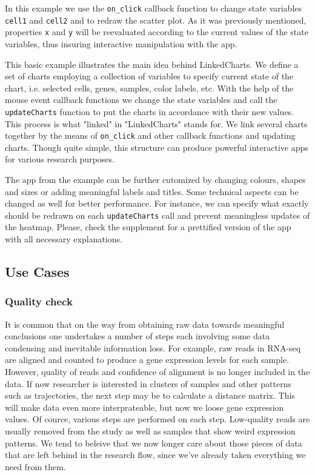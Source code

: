 \documentclass[twocolumn,10pt]{article}
\begin{document}
In this example we use the \texttt{on_click} callback function to change state variables \texttt{cell1} and \texttt{cell2} and to redraw the scatter plot. As it was previously mentioned, properties \texttt{x} and \texttt{y} will be reevaluated according to the current values of the state variables, thus insuring interactive manipulation with the app.

This basic example illustrates the main idea behind LinkedCharts. We define a set of charts employing a collection of variables to specify current state of the chart, i.e. selected cells, genes, samples, color labels, etc. With the help of the mouse event callback functions we change the state variables and call the \texttt{updateCharts} function to put the charts in accordance with their new values. This process is what "linked" in "LinkedCharts" stands for. We link several charts together by the means of \texttt{on_click} and other callback functions and updating charts. Though quite simple, this structure can produce powerful interactive apps for various research purposes.

The app from the example can be further cutomized by changing colours, shapes and sizes or adding meaningful labels and titles. Some technical aspects can be changed as well for better performance. For instance, we can specify what exactly should be redrawn on each \texttt{updateCharts} call and prevent meaningless updates of the heatmap. Please, check the supplement for a prettified version of the app with all necessary explanations.

\subsection{Use Cases}
\subsubsection{Quality check}
It is common that on the way from obtaining raw data towards meaningful conclusions one undertakes a number of steps each involving some data condensing and inevitable information loss. For example, raw reads in RNA-seq are aligned and counted to produce a gene expression levels for each sample. However, quality of reads and confidence of alignment is no longer included in the data. If now researcher is interested in clusters of samples and other patterns such as trajectories, the next step may be to calculate a distance matrix. This will make data even more interprateable, but now we loose gene expression values. Of cource, various steps are performed on each step. Low-quality reads are usually removed from the study as well as samples that show weird expression patterns. We tend to beleive that we now longer care about those pieces of data that are left behind in the research flow, since we've already taken everything we need from them.
\end{document}
